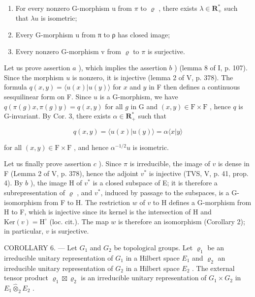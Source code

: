 \begin{enumerate}
\def\labelenumi{\alph{enumi})}
\item
  For every nonzero G-morphism u from \(\pi\) to \(\varrho\) , there exists \(\lambda \in \mathbf{R}_{+}^{*}\) such that \(\lambda u\) is isometric;
\item
  Every G-morphism u from π to ρ has closed image;
\item
  Every nonzero G-morphism v from \(\varrho\) to \(\pi\) is surjective.
\end{enumerate}

Let us prove assertion \(a\) ), which implies the assertion \(b\) ) (lemma 8 of I, p. 107). Since the morphism \(u\) is nonzero, it is injective (lemma 2 of V, p. 378). The formula \(q(x,y) = \langle u(x)|u(y)\rangle\) for \(x\) and \(y\) in F then defines a continuous sesquilinear form on F. Since \(u\) is a G-morphism, we have \(q(\pi(g)x,\pi(g)y) = q(x,y)\) for all \(g\) in G and \((x,y)\in\mathrm{F}\times\mathrm{F}\) , hence \(q\) is G-invariant. By Cor. 3, there exists \(\alpha\in\mathbf{R}_{+}^{*}\) such that

\[
q (x, y) = \langle u (x) | u (y) \rangle = \alpha \langle x | y \rangle
\]

for all \((x,y)\in\mathrm{F}\times\mathrm{F}\) , and hence \(\alpha^{-1/2}u\) is isometric.

Let us finally prove assertion \(c\) ). Since \(\pi\) is irreducible, the image of \(v\) is dense in F (Lemma 2 of V, p. 378), hence the adjoint \(v^*\) is injective (TVS, V, p. 41, prop. 4). By \(b\) ), the image H of \(v^*\) is a closed subspace of E; it is therefore a subrepresentation of \(\varrho\) , and \(v^*\), induced by passage to the subspaces, is a G-isomorphism from F to H. The restriction \(w\) of \(v\) to H defines a G-morphism from H to F, which is injective since its kernel is the intersection of H and \(\text{Ker}(v) = \text{H}^\circ\) (loc. cit.). The map \(w\) is therefore an isomorphism (Corollary 2); in particular, \(v\) is surjective.

COROLLARY 6. --- Let \(G_{1}\) and \(G_{2}\) be topological groups. Let \(\varrho_{1}\) be an irreducible unitary representation of \(G_{1}\) in a Hilbert space \(E_{1}\) and \(\varrho_{2}\) an irreducible unitary representation of \(G_{2}\) in a Hilbert space \(E_{2}\) . The external tensor product \(\varrho_{1} \boxtimes \varrho_{2}\) is an irreducible unitary representation of \(G_{1} \times G_{2}\) in \(E_{1} \widehat{\otimes}_{2} E_{2}\) .

